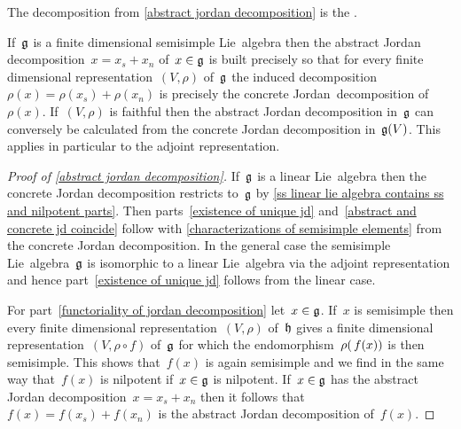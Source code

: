 \begin{definition}
  The decomposition from \cref{abstract jordan decomposition} is the .
\end{definition}


\begin{remark}
  If~$\mathfrak{g}$ is a finite dimensional semisimple Lie~algebra then the abstract Jordan decomposition~$x = x_s + x_n$ of~$x \in \mathfrak{g}$ is built precisely so that for every finite dimensional representation~$(V,\rho)$ of~$\mathfrak{g}$ the induced decomposition~$\rho(x) = \rho(x_s) + \rho(x_n)$ is precisely the concrete Jordan~decomposition of~$\rho(x)$.
  If~$(V,\rho)$ is faithful then the abstract Jordan decomposition in~$\mathfrak{g}$ can conversely be calculated from the concrete Jordan decomposition in~$\mathfrak{g}(V)$.
  This applies in particular to the adjoint representation.
\end{remark}

\begin{proof}[Proof of \cref{abstract jordan decomposition}]
  If~$\mathfrak{g}$ is a linear Lie~algebra then the concrete Jordan decomposition restricts to~$\mathfrak{g}$ by \cref{ss linear lie algebra contains ss and nilpotent parts}.
  Then parts~\ref*{existence of unique jd} and~\ref*{abstract and concrete jd coincide} follow with \cref{characterizations of semisimple elements} from the concrete Jordan decomposition.
  In the general case the semisimple Lie~algebra~$\mathfrak{g}$ is isomorphic to a linear Lie~algebra via the adjoint representation and hence part~\ref*{existence of unique jd} follows from the linear case.
  
  For part~\ref*{functoriality of jordan decomposition} let~$x \in \mathfrak{g}$.
  If~$x$ is semisimple then every finite dimensional representation~$(V, \rho)$ of~$\mathfrak{h}$ gives a finite dimensional representation~$(V, \rho \circ f)$ of~$\mathfrak{g}$ for which the endomorphism~$\rho(\, f(x))$ is then semisimple.
  This shows that~$f(x)$ is again semisimple and we find in the same way that~$f(x)$ is nilpotent if~$x \in \mathfrak{g}$ is nilpotent.
  If~$x \in \mathfrak{g}$ has the abstract Jordan decomposition~$x = x_s + x_n$ then it follows that~$f(x) = f(x_s) + f(x_n)$ is the abstract Jordan decomposition of~$f(x)$.
\end{proof}


